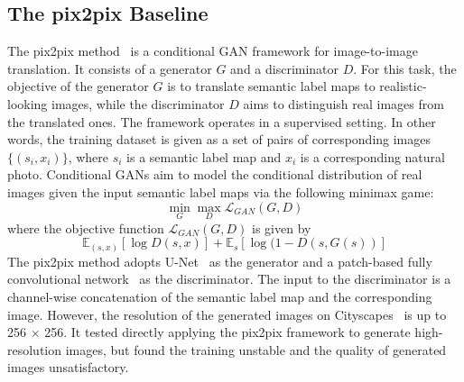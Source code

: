 \documentclass[10pt,twocolumn,letterpaper]{article}
\begin{document}
\subsection{The pix2pix Baseline}\label{I_1}
The pix2pix method~\cite{Isola2017Image} is a conditional GAN framework for image-to-image translation. It consists of a generator $G$ and a discriminator $D$. For this task, the objective of the generator $G$ is to translate semantic label maps to realistic-looking images, while the discriminator $D$ aims to distinguish real images from the translated ones. The framework operates in a supervised setting. In other words, the training dataset is given as a set of pairs of corresponding images $\{(s_i , x_i)\}$, where $s_i$ is a semantic label map and $x_i$ is a corresponding natural photo. Conditional GANs aim to model the conditional distribution of real images given the input semantic label maps via the following minimax game:
\begin{equation}
\min_G \max_D\mathcal{L}_{GAN}(G,D)
\label{Eq:1}
\end{equation}
where the objective function $\mathcal{L}_{GAN}(G,D)$ is given by
\begin{equation}
\mathbb{E}_{(s,x)}[\log D(s, x)]+\mathbb{E}_s[\log(1-D(s, G(s))]
\end{equation}
The pix2pix method adopts U-Net~\cite{Ronneberger2015U} as the generator and a patch-based fully convolutional network~\cite{Shelhamer2014Fully} as the discriminator. The input to the discriminator is a channel-wise concatenation of the semantic label map and the corresponding image. However, the resolution of the generated images on Cityscapes~\cite{Cordts2016The} is up to 256 $\times$ 256. It tested directly applying the pix2pix framework to generate high-resolution images, but found the training unstable and the quality of generated images unsatisfactory.


{\small


}
\end{document}
